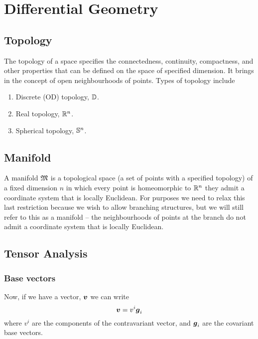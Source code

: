 \chapter{Differential Geometry}
\label{cha:differentialgeometry}

\section{Topology}

The topology of a space specifies the connectedness, continuity, compactness,
and other properties that can be defined on the space of specified
dimension. It brings in the concept of open neighbourhoods of points. Types of
topology include

\begin{enumerate}
\item Discrete (OD) topology, $\dntopology{}$.
\item Real topology, $\rntopology{n}$.
\item Spherical topology, $\sntopology{n}$.
\end{enumerate}

\section{Manifold}

A manifold $ \mathfrak{M} $ is a topological space (\ie a set of points with a specified
topology) of a fixed dimension $n$ in which every point is homeomorphic to
$\rntopology{n}$ \ie they admit a coordinate system that is locally
Euclidean. For \FieldML purposes we need to relax this last restriction because
we wish to allow branching structures, but we will still refer to this as a
manifold – the neighbourhoods of points at the branch do not admit a
coordinate system that is locally Euclidean.

\section{Tensor Analysis}
\subsection{Base vectors}

Now, if we have a vector, $\vect{v}$ we can write
\begin{equation}
  \vect{v}=v^{i}\vect{g}_{i}
\end{equation}
where $v^{i}$ are the components of the contravariant vector, and
$\vect{g}_{i}$ are the covariant base vectors.

